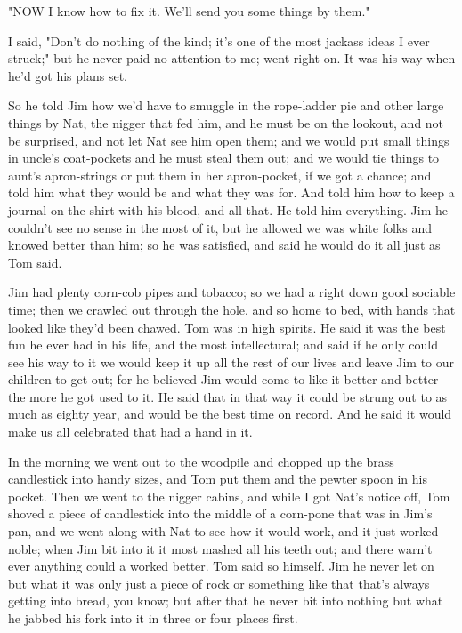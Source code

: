 "NOW I know how to fix it.  We'll send you some things by them."

I said, "Don't do nothing of the kind; it's one of the most jackass ideas
I ever struck;" but he never paid no attention to me; went right on.  It
was his way when he'd got his plans set.

So he told Jim how we'd have to smuggle in the rope-ladder pie and other
large things by Nat, the nigger that fed him, and he must be on the
lookout, and not be surprised, and not let Nat see him open them; and we
would put small things in uncle's coat-pockets and he must steal them
out; and we would tie things to aunt's apron-strings or put them in her
apron-pocket, if we got a chance; and told him what they would be and
what they was for.  And told him how to keep a journal on the shirt with
his blood, and all that. He told him everything.  Jim he couldn't see no
sense in the most of it, but he allowed we was white folks and knowed
better than him; so he was satisfied, and said he would do it all just as
Tom said.

Jim had plenty corn-cob pipes and tobacco; so we had a right down good
sociable time; then we crawled out through the hole, and so home to bed,
with hands that looked like they'd been chawed.  Tom was in high spirits.
He said it was the best fun he ever had in his life, and the most
intellectural; and said if he only could see his way to it we would keep
it up all the rest of our lives and leave Jim to our children to get out;
for he believed Jim would come to like it better and better the more he
got used to it.  He said that in that way it could be strung out to as
much as eighty year, and would be the best time on record.  And he said
it would make us all celebrated that had a hand in it.

In the morning we went out to the woodpile and chopped up the brass
candlestick into handy sizes, and Tom put them and the pewter spoon in
his pocket.  Then we went to the nigger cabins, and while I got Nat's
notice off, Tom shoved a piece of candlestick into the middle of a
corn-pone that was in Jim's pan, and we went along with Nat to see how it
would work, and it just worked noble; when Jim bit into it it most mashed
all his teeth out; and there warn't ever anything could a worked better.
Tom said so himself. Jim he never let on but what it was only just a
piece of rock or something like that that's always getting into bread,
you know; but after that he never bit into nothing but what he jabbed his
fork into it in three or four places first.


